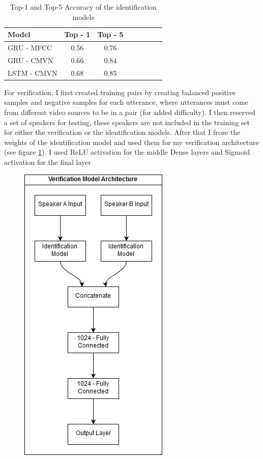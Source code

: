 \documentclass{article}
\begin{document}
\begin{table}[H]
    \centering
    \begin{tabular}{l*{6}{c}r}
        Model & Top - 1 & Top - 5\\
        \hline
        GRU - MFCC & 0.56 & 0.76  \\
        GRU - CMVN & 0.66 & 0.84  \\
        LSTM - CMVN & 0.68 & 0.85  \\
    \end{tabular}
    \caption{Top-1 and Top-5 Accuracy of the identification models}
    \label{tab:id_results}
\end{table}
For verification, I first created training pairs by creating balanced positive samples and negative samples for each utterance, where utterances must come from different video sources to be in a pair (for added difficulty). I then reserved a set of speakers for testing, these speakers are not included in the training set for either the verification or the identification models.
After that I froze the weights of the identification model and used them for my verification architecture (see figure \ref{fig:ver_arch}).
I used ReLU activation for the middle Dense layers and Sigmoid activation for the final layer

\begin{figure}[H]
    \centering
    \includegraphics[scale=.65]{images/verification_model.png}
    \label{fig:ver_arch}
\end{figure}
\end{document}
